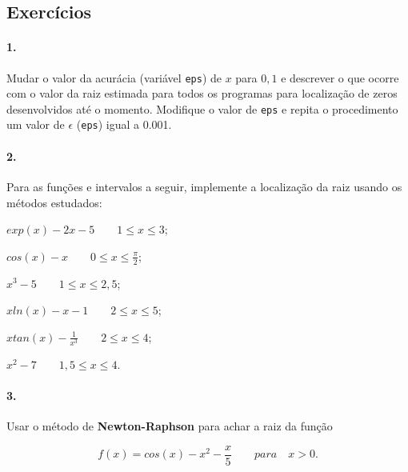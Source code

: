 \date{2022-03-15}
\maketitle

\subsection*{Exercícios}

\paragraph{1.} Mudar o valor da acurácia (variável {\tt eps}) de $x$ para $0,1$ e
descrever o que ocorre com o valor da raiz estimada para todos 
os programas para localização de zeros desenvolvidos até o momento. 
Modifique o valor de {\tt eps} e repita o procedimento 
um valor de $\epsilon$ ({\tt eps}) igual a 0.001.

\paragraph{2.} Para as funções e intervalos a seguir, implemente a localização da raiz
usando os métodos estudados:

\begin{enumerate}[a)]
	\begin{minipage}{0.5\textwidth}
	\item $exp(x) -2x -5\qquad 1\leq x\leq 3$;
	\item $cos(x)-x\qquad0\leq x\leq\frac{\pi}{2}$; 
	\item $x^3-5\qquad 1\leq x \leq 2,5$;
	\end{minipage}
	\begin{minipage}{0.5\textwidth}
	\item $xln(x)-x-1\qquad 2\leq x\leq 5 $;
	\item $xtan(x)-\frac{1}{x^3}\qquad 2\leq x\leq 4$;
	\item $x^2-7\qquad 1,5\leq x\leq 4$.
	\end{minipage}
\end{enumerate}

\paragraph{3.} Usar o método de {\bf Newton-Raphson} para achar
a raiz da função 

\begin{equation}
	f(x) = cos(x) - x^2 - \frac{x}{5}\qquad para\quad x>0.
\end{equation}
